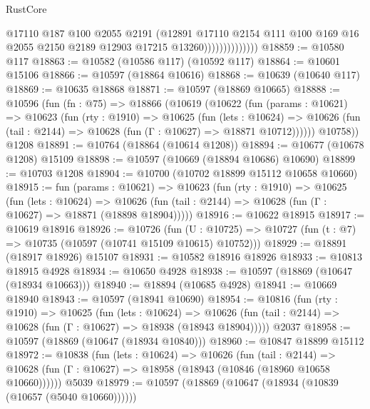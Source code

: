\begin{lexlean}{RustCore}
\begin{coremodule}
                              @17110
                              @187
                              @100
                              @2055
                              @2191
                              (@12891
                                @17110
                                @2154
                                @111
                                @100
                                @169
                                @16
                                @2055
                                @2150
                                @2189
                                @12903
                                @17215
                                @13260))))))))))))))
@18859 := @10580 @117
@18863 := @10582 (@10586 @117) (@10592 @117)
@18864 := @10601 @15106
@18866 := @10597 (@18864 @10616)
@18868 := @10639 (@10640 @117)
@18869 := @10635 @18868
@18871 := @10597 (@18869 @10665)
@18888 := @10596
    (fun (fn : @75) =>
    @18866
      (@10619
        (@10622
          (fun (params : @10621) =>
          @10623
            (fun (rty : @1910) =>
            @10625
              (fun (lets : @10624) =>
              @10626 (fun (tail : @2144) => @10628 (fun (Γ : @10627) => @18871 @10712))))))
        @10758))
    @1208
@18891 := @10764 (@18864 (@10614 @1208))
@18894 := @10677 (@10678 @1208) @15109
@18898 := @10597 (@10669 (@18894 @10686) @10690)
@18899 := @10703 @1208
@18904 := @10700 (@10702 @18899 @15112 @10658 @10660)
@18915 := fun (params : @10621) =>
  @10623
    (fun (rty : @1910) =>
    @10625
      (fun (lets : @10624) =>
      @10626 (fun (tail : @2144) => @10628 (fun (Γ : @10627) => @18871 (@18898 @18904)))))
@18916 := @10622 @18915
@18917 := @10619 @18916
@18926 := @10726
    (fun (U : @10725) => @10727 (fun (t : @7) => @10735 (@10597 (@10741 @15109 @10615) @10752)))
@18929 := @18891 (@18917 @18926) @15107
@18931 := @10582 @18916 @18926
@18933 := @10813 @18915 @4928
@18934 := @10650 @4928
@18938 := @10597 (@18869 (@10647 (@18934 @10663)))
@18940 := @18894 (@10685 @4928)
@18941 := @10669 @18940
@18943 := @10597 (@18941 @10690)
@18954 := @10816
    (fun (rty : @1910) =>
    @10625
      (fun (lets : @10624) =>
      @10626 (fun (tail : @2144) => @10628 (fun (Γ : @10627) => @18938 (@18943 @18904)))))
    @2037
@18958 := @10597 (@18869 (@10647 (@18934 @10840)))
@18960 := @10847 @18899 @15112
@18972 := @10838
    (fun (lets : @10624) =>
    @10626
      (fun (tail : @2144) =>
      @10628 (fun (Γ : @10627) => @18958 (@18943 (@10846 (@18960 @10658 @10660))))))
    @5039
@18979 := @10597 (@18869 (@10647 (@18934 (@10839 (@10657 (@5040 @10660))))))

\end{coremodule}
\end{lexlean}
